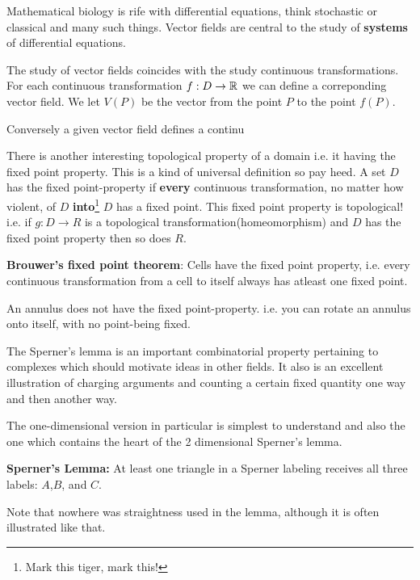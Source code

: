 \newchunk Mathematical biology is rife with differential equations, think
stochastic or classical and many such things. Vector fields are central to
the study of \textbf{systems} of differential equations. 

\newchunk The study of vector fields coincides with the study continuous
transformations. For each continuous transformation $f: D \rightarrow \mathbb{R}$
we can define a correponding vector field. We let $V(P)$ be the vector
from the point $P$ to the point $f(P)$. 

\newchunk Conversely a given vector field defines a continu


\newchunk There is another interesting topological property of a domain
i.e. it having the fixed point property. This is a kind of universal
definition so pay heed. A set $D$ has the fixed point-property if
\textbf{every} continuous transformation, no matter how violent, of
$D$ \textbf{into}\footnote{Mark this tiger, mark this!} $D$ has a
fixed point. This fixed point property is topological! i.e. if
$g : D \rightarrow R$ is a topological transformation(homeomorphism)
and $D$ has the fixed point property then so does $R$. 


\begin{ftheo}
  \textbf{Brouwer's fixed point theorem}: Cells have the fixed point
  property, i.e. every continuous transformation from a cell to itself
  always has atleast one fixed point. 
\end{ftheo}



\newchunk An annulus does not have the fixed point-property. i.e. you
can rotate an annulus onto itself, with no point-being fixed. 


\newchunk The Sperner's lemma is an important combinatorial property
pertaining to complexes which should motivate ideas in other fields.
It also is an excellent illustration of charging arguments and counting
a certain fixed quantity one way and then another way. 

The one-dimensional version in particular is simplest to understand
and also the one which contains the heart of the 2 dimensional
Sperner's lemma. 

\begin{ftheo}
  \textbf{Sperner's Lemma:} At least one triangle in a Sperner labeling
  receives all three labels: $A$,$B$, and $C$. 
\end{ftheo}

Note that nowhere was straightness used in the lemma, although it is
often illustrated like that. 

